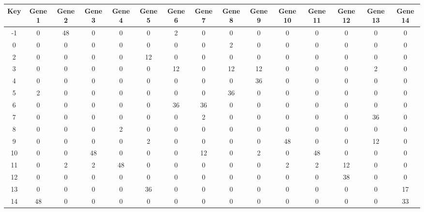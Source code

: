 \begin{tabular}{|c|c|c|c|c|c|c|c|c|c|c|c|c|c|c|}
\hline
Key & Gene 1 & Gene 2 & Gene 3 & Gene 4 & Gene 5 & Gene 6 & Gene 7 & Gene 8 & Gene 9 & Gene 10 & Gene 11 & Gene 12 & Gene 13 & Gene 14 \\
\hline
-1 & 0 & 48 & 0 & 0 & 0 & 2 & 0 & 0 & 0 & 0 & 0 & 0 & 0 & 0 \\
0 & 0 & 0 & 0 & 0 & 0 & 0 & 0 & 2 & 0 & 0 & 0 & 0 & 0 & 0 \\
2 & 0 & 0 & 0 & 0 & 12 & 0 & 0 & 0 & 0 & 0 & 0 & 0 & 0 & 0 \\
3 & 0 & 0 & 0 & 0 & 0 & 12 & 0 & 12 & 12 & 0 & 0 & 0 & 2 & 0 \\
4 & 0 & 0 & 0 & 0 & 0 & 0 & 0 & 0 & 36 & 0 & 0 & 0 & 0 & 0 \\
5 & 2 & 0 & 0 & 0 & 0 & 0 & 0 & 36 & 0 & 0 & 0 & 0 & 0 & 0 \\
6 & 0 & 0 & 0 & 0 & 0 & 36 & 36 & 0 & 0 & 0 & 0 & 0 & 0 & 0 \\
7 & 0 & 0 & 0 & 0 & 0 & 0 & 2 & 0 & 0 & 0 & 0 & 0 & 36 & 0 \\
8 & 0 & 0 & 0 & 2 & 0 & 0 & 0 & 0 & 0 & 0 & 0 & 0 & 0 & 0 \\
9 & 0 & 0 & 0 & 0 & 2 & 0 & 0 & 0 & 0 & 48 & 0 & 0 & 12 & 0 \\
10 & 0 & 0 & 48 & 0 & 0 & 0 & 12 & 0 & 2 & 0 & 48 & 0 & 0 & 0 \\
11 & 0 & 2 & 2 & 48 & 0 & 0 & 0 & 0 & 0 & 2 & 2 & 12 & 0 & 0 \\
12 & 0 & 0 & 0 & 0 & 0 & 0 & 0 & 0 & 0 & 0 & 0 & 38 & 0 & 0 \\
13 & 0 & 0 & 0 & 0 & 36 & 0 & 0 & 0 & 0 & 0 & 0 & 0 & 0 & 17 \\
14 & 48 & 0 & 0 & 0 & 0 & 0 & 0 & 0 & 0 & 0 & 0 & 0 & 0 & 33 \\
\hline
\end{tabular}
